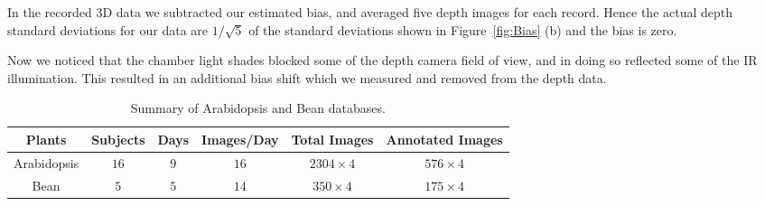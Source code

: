 In the recorded $3$D data we subtracted our estimated bias, and averaged five depth images for each record.  Hence the actual depth standard deviations for our data are $1/\sqrt{5}$ of the standard deviations shown in Figure~\ref{fig:Bias} (b) and the bias is zero.

Now we noticed that the chamber light shades blocked some of the depth camera field of view, and in doing so reflected some of the IR illumination.  This resulted in an additional bias shift which we measured and removed from the depth data. %



\begin{table*}[t!]
\begin{center}
\caption{Summary of Arabidopsis and Bean databases.}
\label{tab:stat}
\begin{tabular}{c|c|c|c|c|c}
      \hline
      Plants     & Subjects & Days & Images/Day & Total Images & Annotated Images \\
      \hline
      Arabidopsis &  $16$      &  $9$   &     $16$     &     $2304\times 4$     &       $576\times 4$     \\
      \hline
      Bean        &   $5$      &  $5$   &     $14$     &     $350\times 4$       &       $175\times 4$  \\
      \hline
\end{tabular}
\end{center}
\end{table*}



